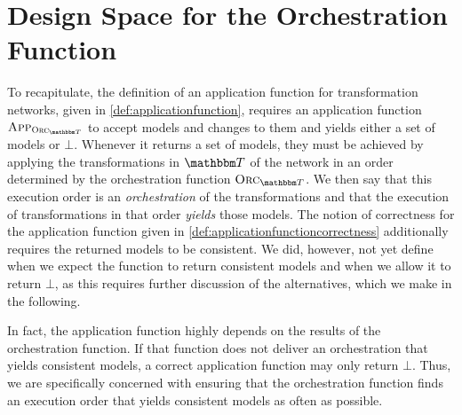 

\section{Design Space for the Orchestration Function} %

To recapitulate, the definition of an application function for transformation networks, given in \autoref{def:applicationfunction}, requires an application function $\appfunction{\orcfunction{\transformationset{T}}}$ to accept models and changes to them and yields either a set of models or $\bot$.
Whenever it returns a set of models, they must be achieved by applying the transformations in $\transformationset{T}$ of the network in an order determined by the orchestration function $\orcfunction{\transformationset{T}}$.
We then say that this execution order is an \emph{orchestration} of the transformations and that the execution of transformations in that order \emph{yields} those models.
The notion of correctness for the application function given in \autoref{def:applicationfunctioncorrectness} additionally requires the returned models to be consistent.
We did, however, not yet define when we expect the function to return consistent models and when we allow it to return $\bot$, as this requires further discussion of the alternatives, which we make in the following.

In fact, the application function highly depends on the results of the orchestration function.
If that function does not deliver an orchestration that yields consistent models, a correct application function may only return $\bot$.
Thus, we are specifically concerned with ensuring that the orchestration function finds an execution order that yields consistent models as often as possible.


